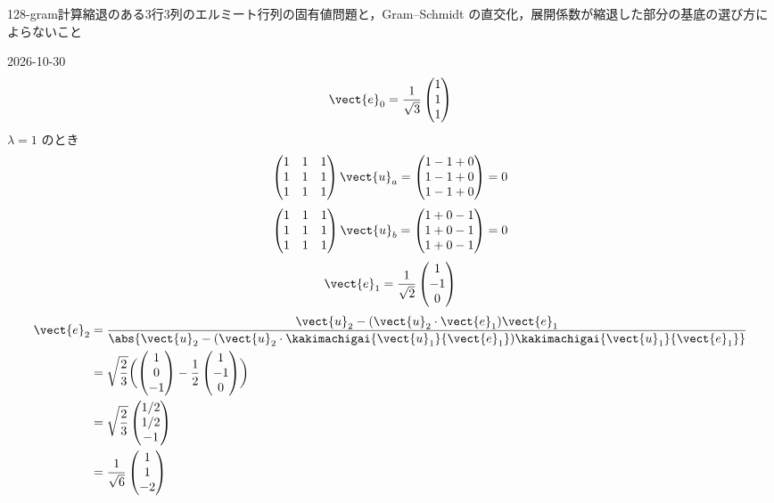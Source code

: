 \documentclass[uplatex,dvipdfmx,a4paper,11pt]{jsarticle}
\begin{document}
\begin{mondai}{128-gram}{計算}{縮退のある3行3列のエルミート行列の固有値問題と，Gram--Schmidt の直交化，展開係数が縮退した部分の基底の選び方によらないこと}
\begin{kotaeutsushi}{2026-10-30}
\[ \vect{e}_{0}=\frac{1}{\sqrt{3}}\begin{pmatrix}1\\1\\1\end{pmatrix} \]
$\lambda=1$ のとき
\[ \begin{pmatrix}1&1&1\\1&1&1\\1&1&1\end{pmatrix}\vect{u}_{a}=\begin{pmatrix}1-1+0\\1-1+0\\1-1+0\end{pmatrix}=0 \]
\[ \begin{pmatrix}1&1&1\\1&1&1\\1&1&1\end{pmatrix}\vect{u}_{b}=\begin{pmatrix}1+0-1\\1+0-1\\1+0-1\end{pmatrix}=0 \]
\[ \vect{e}_{1}=\frac{1}{\sqrt{2}}\begin{pmatrix}1\\-1\\0\end{pmatrix} \]
\begin{align*}
\vect{e}_{2}&=\frac{\vect{u}_{2}-(\vect{u}_{2}\cdot\vect{e}_{1})\vect{e}_{1}}{\abs{\vect{u}_{2}-(\vect{u}_{2}\cdot\kakimachigai{\vect{u}_{1}}{\vect{e}_{1}})\kakimachigai{\vect{u}_{1}}{\vect{e}_{1}}}}\\
&=\sqrt{\frac{2}{3}}\biggl(\begin{pmatrix}1\\0\\-1\end{pmatrix}-\frac{1}{2}\begin{pmatrix}1\\-1\\0\end{pmatrix}\biggr)\\
&=\sqrt{\frac{2}{3}}\begin{pmatrix}1/2\\1/2\\-1\end{pmatrix}\\
&=\frac{1}{\sqrt{6}}\begin{pmatrix}1\\1\\-2\end{pmatrix}

\end{align*}
\end{kotaeutsushi}
\end{mondai}
\end{document}
